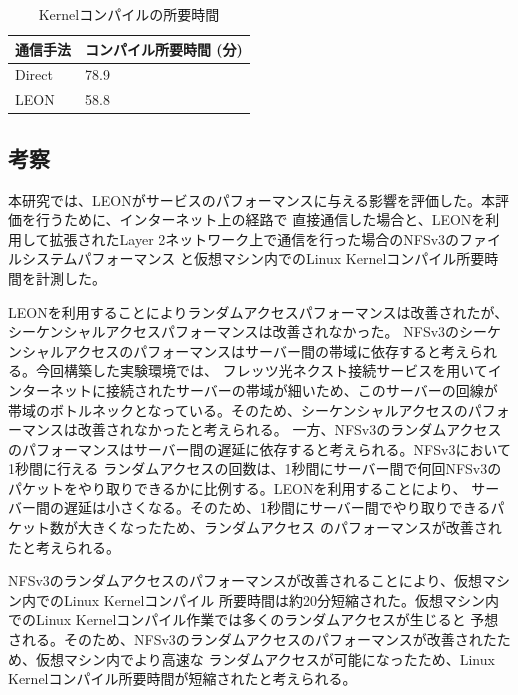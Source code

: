 \begin{table}[tb]
        \begin{center}
                \caption{Kernelコンパイルの所要時間}
                \begin{tabular}{|l|l|}
                        \hline
                                通信手法 & コンパイル所要時間 (分) \\
                        \hline
			\hline
                                Direct & 78.9 \\
			\hline
				LEON & 58.8\\
                        \hline
                \end{tabular}
                \label{kernelcompile}
        \end{center}
\end{table}

\subsection{考察}

本研究では、LEONがサービスのパフォーマンスに与える影響を評価した。本評価を行うために、インターネット上の経路で
直接通信した場合と、LEONを利用して拡張されたLayer 2ネットワーク上で通信を行った場合のNFSv3のファイルシステムパフォーマンス
と仮想マシン内でのLinux Kernelコンパイル所要時間を計測した。

LEONを利用することによりランダムアクセスパフォーマンスは改善されたが、シーケンシャルアクセスパフォーマンスは改善されなかった。
NFSv3のシーケンシャルアクセスのパフォーマンスはサーバー間の帯域に依存すると考えられる。今回構築した実験環境では、
フレッツ光ネクスト接続サービスを用いてインターネットに接続されたサーバーの帯域が細いため、このサーバーの回線が
帯域のボトルネックとなっている。そのため、シーケンシャルアクセスのパフォーマンスは改善されなかったと考えられる。
一方、NFSv3のランダムアクセスのパフォーマンスはサーバー間の遅延に依存すると考えられる。NFSv3において1秒間に行える
ランダムアクセスの回数は、1秒間にサーバー間で何回NFSv3のパケットをやり取りできるかに比例する。LEONを利用することにより、
サーバー間の遅延は小さくなる。そのため、1秒間にサーバー間でやり取りできるパケット数が大きくなったため、ランダムアクセス
のパフォーマンスが改善されたと考えられる。

NFSv3のランダムアクセスのパフォーマンスが改善されることにより、仮想マシン内でのLinux Kernelコンパイル
所要時間は約20分短縮された。仮想マシン内でのLinux Kernelコンパイル作業では多くのランダムアクセスが生じると
予想される。そのため、NFSv3のランダムアクセスのパフォーマンスが改善されたため、仮想マシン内でより高速な
ランダムアクセスが可能になったため、Linux Kernelコンパイル所要時間が短縮されたと考えられる。

